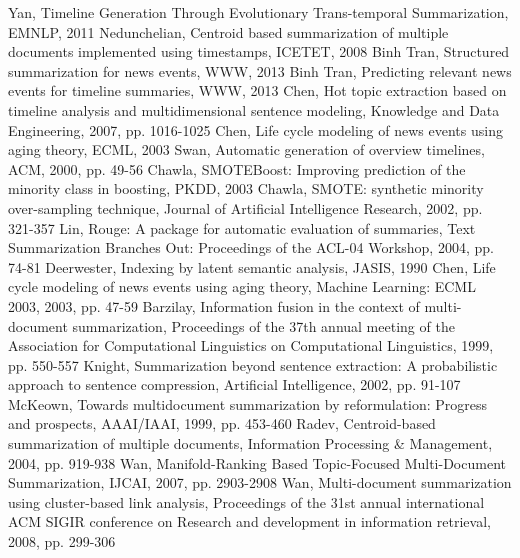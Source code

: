 \documentclass[print]{jicspack}
\begin{document}
\begin{thebibliography}{00}
%	
%	
 Yan, Timeline Generation Through Evolutionary Trans-temporal Summarization, EMNLP, 2011
 Nedunchelian, Centroid based summarization of multiple documents implemented using timestamps, ICETET, 2008
 Binh Tran, Structured summarization for news events, WWW, 2013
 Binh Tran, Predicting relevant news events for timeline summaries, WWW, 2013
 Chen, Hot topic extraction based on timeline analysis and multidimensional sentence modeling, Knowledge and Data Engineering, 2007, pp. 1016-1025
 Chen, Life cycle modeling of news events using aging theory, ECML, 2003
 Swan, Automatic generation of overview timelines, ACM, 2000, pp. 49-56
 Chawla, SMOTEBoost: Improving prediction of the minority class in boosting, PKDD, 2003
 Chawla, SMOTE: synthetic minority over-sampling technique, Journal of Artiﬁcial Intelligence Research, 2002, pp. 321-357
 Lin, Rouge: A package for automatic evaluation of summaries, Text Summarization Branches Out: Proceedings of the ACL-04 Workshop, 2004, pp. 74-81
 Deerwester, Indexing by latent semantic analysis, JASIS, 1990
 Chen, Life cycle modeling of news events using aging theory, Machine Learning: ECML 2003, 2003, pp. 47-59
 Barzilay, Information fusion in the context of multi-document summarization, Proceedings of the 37th annual meeting of the Association for Computational Linguistics on Computational Linguistics, 1999, pp. 550-557
 Knight, Summarization beyond sentence extraction: A probabilistic approach to sentence compression, Artificial Intelligence, 2002, pp. 91-107
 McKeown, Towards multidocument summarization by reformulation: Progress and prospects, AAAI/IAAI, 1999, pp. 453-460
 Radev, Centroid-based summarization of multiple documents, Information Processing \& Management, 2004, pp. 919-938
 Wan, Manifold-Ranking Based Topic-Focused Multi-Document Summarization, IJCAI, 2007, pp. 2903-2908
 Wan, Multi-document summarization using cluster-based link analysis, Proceedings of the 31st annual international ACM SIGIR conference on Research and development in information retrieval, 2008, pp. 299-306

\end{thebibliography}
\end{document}
